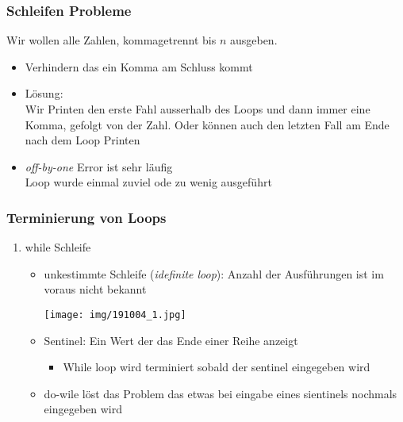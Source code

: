 \documentclass[11pt]{article}
\begin{document}
\subsubsection{Schleifen Probleme}
\label{sec:org09a1abb}
Wir wollen alle Zahlen, kommagetrennt bis \(n\) ausgeben.\\
\begin{itemize}
\item Verhindern das ein Komma am Schluss kommt\\
\item Lösung:\\
Wir Printen den erste Fahl ausserhalb des Loops und dann immer eine Komma, gefolgt von der Zahl. Oder können auch den letzten Fall am Ende nach dem Loop Printen\\
\item \emph{off-by-one} Error ist sehr läufig\\
Loop wurde einmal zuviel ode zu wenig ausgeführt\\
\end{itemize}

\subsubsection{Terminierung von Loops}
\label{sec:orgdca50be}
\begin{enumerate}
\item while Schleife
\label{sec:org6f86046}
\begin{itemize}
\item unkestimmte Schleife (\emph{idefinite loop}): Anzahl der Ausführungen ist im voraus nicht bekannt\\
\begin{center}
\texttt{[image: img/191004\_1.jpg]}
\end{center}

\item Sentinel: Ein Wert der das Ende einer Reihe anzeigt\\
\begin{itemize}
\item While loop wird terminiert sobald der sentinel eingegeben wird\\
\end{itemize}

\item do-wile löst das Problem das etwas bei eingabe eines sientinels nochmals eingegeben wird\\
\end{itemize}
\end{enumerate}
\end{document}
